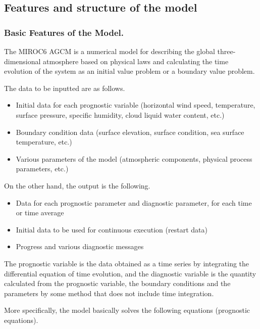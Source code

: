 \hypertarget{features-and-structure-of-the-model}{%
\subsection{Features and structure of the
model}\label{features-and-structure-of-the-model}}

\hypertarget{basic-features-of-the-model.}{%
\subsubsection{Basic Features of the
Model.}\label{basic-features-of-the-model.}}

The MIROC6 AGCM is a numerical model for describing the global
three-dimensional atmosphere based on physical laws and calculating the
time evolution of the system as an initial value problem or a boundary
value problem.

The data to be inputted are as follows.

\begin{itemize}
\item
  Initial data for each prognostic variable (horizontal wind speed,
  temperature, surface pressure, specific humidity, cloud liquid water
  content, etc.)
\item
  Boundary condition data (surface elevation, surface condition, sea
  surface temperature, etc.)
\item
  Various parameters of the model (atmospheric components, physical
  process parameters, etc.)
\end{itemize}

On the other hand, the output is the following.

\begin{itemize}
\item
  Data for each prognostic parameter and diagnostic parameter, for each
  time or time average
\item
  Initial data to be used for continuous execution (restart data)
\item
  Progress and various diagnostic messages
\end{itemize}

The prognostic variable is the data obtained as a time series by
integrating the differential equation of time evolution, and the
diagnostic variable is the quantity calculated from the prognostic
variable, the boundary conditions and the parameters by some method that
does not include time integration.

More specifically, the model basically solves the following equations
(prognostic equations).

